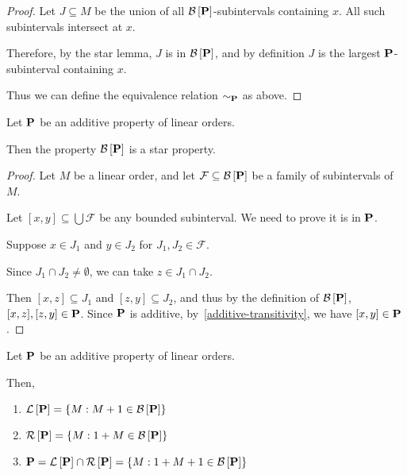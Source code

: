 \begin{proof}
  Let $J \subseteq M$ be the union of all $\mathcal{B} \left[ {{\mathbf{P}}} \right]$-subintervals containing $x$.
  All such subintervals intersect at $x$.

  Therefore, by the star lemma, $J$ is in $\mathcal{B} \left[ {{\mathbf{P}}} \right]$, and by definition
  $J$ is the largest $\mathbf{P}$-subinterval containing $x$.

  Thus we can define the equivalence relation $\sim_{\mathbf{P}}$ as above.
\end{proof}

\begin{lemma}\label{star-lemma}
  Let $\mathbf{P}$ be an additive property of linear orders.

  Then the property $\mathcal{B} \left[ {{\mathbf{P}}} \right]$ is a star property.
\end{lemma}

\begin{proof}
  Let $M$ be a linear order,
  and let $\mathcal{F} \subseteq \mathcal{B} \left[ {{\mathbf{P}}} \right]$ be a family of subintervals of $M$.

  Let $[x, y] \subseteq \bigcup \mathcal{F}$ be any bounded subinterval. We need to prove
  it is in $\mathbf{P}$.

  Suppose $x \in J_1$ and $y \in J_2$ for $J_1, J_2 \in \mathcal{F}$.

  Since $J_1 \cap J_2 \ne \emptyset$, we can take $z \in J_1 \cap J_2$.

  Then $[x, z] \subseteq J_1$ and $[z, y] \subseteq J_2$,
  and thus by the definition of $\mathcal{B} \left[ {{\mathbf{P}}} \right]$, $[x, z], [z, y] \in \mathbf{P}$.
  Since $\mathbf{P}$ is additive, by~\cref{additive-transitivity}, we have $[x, y] \in \mathbf{P}$.
\end{proof}

\begin{lemma}\label{bounded-properties}
  Let $\mathbf{P}$ be an additive property of linear orders.

  Then,
  \begin{enumerate}
    \item $\mathcal{L} \left[ {{\mathbf{P}}} \right] = \left\{ {M : M + 1 \in \mathcal{B} \left[ {{\mathbf{P}}} \right]} \right\}$
    \item $\mathcal{R} \left[ {{\mathbf{P}}} \right] = \left\{ {M : 1 + M \in \mathcal{B} \left[ {{\mathbf{P}}} \right]} \right\}$
    \item $\mathbf{P} = \mathcal{L} \left[ {{\mathbf{P}}} \right] \cap \mathcal{R} \left[ {{\mathbf{P}}} \right] = \left\{ {M : 1 + M + 1 \in \mathcal{B} \left[ {{\mathbf{P}}} \right]} \right\}$
  \end{enumerate}
\end{lemma}

